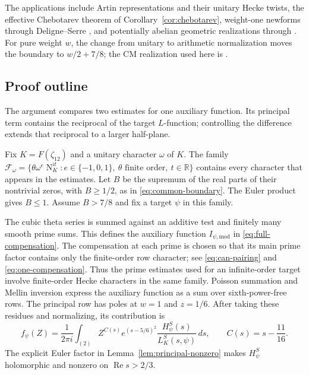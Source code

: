 \documentclass[11pt,a4paper]{article}
\numberwithin{equation}{section}
\theoremstyle{definition}
\theoremstyle{remark}
\newcommand{\RR}{\mathbb R}
\newcommand{\Rea}{\operatorname{Re}}
\newcommand{\Norm}{\operatorname{N}}
\newcommand{\cF}{\mathcal F}
\begin{document}
The applications include Artin representations and their unitary Hecke
twists, the effective Chebotarev theorem of
Corollary~\ref{cor:chebotarev}, weight-one newforms through
Deligne--Serre \cite[Theorems~4.1 and~4.6]{DS}, and potentially abelian
geometric realizations through \cite[Corollary~10 and Lemma~14]{Johansson}.
For pure weight $w$, the change from unitary to arithmetic normalization
moves the boundary to $w/2+7/8$; the CM realization used here is
\cite[Corollaries~7.6, 7.9 and Proposition~7.12]{Fargues}.

\subsection{Proof outline}\label{subsec:proof-outline}

The argument compares two estimates for one auxiliary function. Its
principal term contains the reciprocal of the target $L$-function;
controlling the difference extends that reciprocal to a larger
half-plane.

Fix $K=F(\zeta_{12})$ and a unitary character $\omega$ of $K$.
The family
$\cF_\omega=\{\theta\omega^e\Norm_K^{it}:e\in\{-1,0,1\},\
\theta\text{ finite order},\ t\in\RR\}$ contains every character
that appears in the estimates. Let $B$ be the supremum of the real
parts of their nontrivial zeros, with $B\ge1/2$, as in
\eqref{eq:common-boundary}. The Euler product gives $B\le1$.
Assume $B>7/8$ and fix a target $\psi$ in this family.

The cubic theta series is summed against an additive test and finitely
many smooth prime sums. This defines the auxiliary function
$I_{\psi,\mathrm{mod}}$ in \eqref{eq:full-compensation}. The
compensation at each prime is chosen so that its main prime factor
contains only the finite-order row character; see
\eqref{eq:can-pairing} and \eqref{eq:one-compensation}. Thus the
prime estimates used for an infinite-order target involve
finite-order Hecke characters in the same family. Poisson summation
and Mellin inversion express the auxiliary function as a sum over
sixth-power-free rows. The principal row has poles at $w=1$ and
$z=1/6$. After taking these residues and normalizing, its contribution is
\[
 f_\psi(Z)=\frac{1}{2\pi i}\int_{(2)}
 Z^{C(s)}e^{(s-5/6)^2}\frac{H_\psi^S(s)}{L_K^S(s,\psi)}\,ds,
 \qquad C(s)=s-\frac{11}{16}.
\]
The explicit Euler factor in Lemma~\ref{lem:principal-nonzero}
makes $H_\psi^S$ holomorphic and nonzero on $\Rea s>2/3$.
\end{document}
